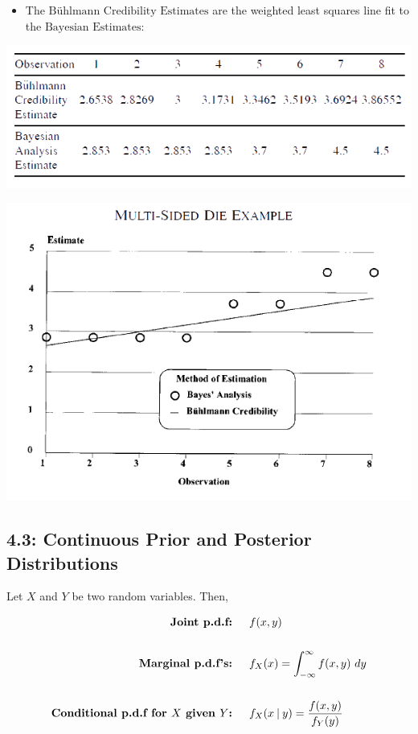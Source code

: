 \documentclass[
]{article}
\providecommand{\tightlist}{%
  \setlength{\itemsep}{0pt}\setlength{\parskip}{0pt}}
\begin{document}
\begin{itemize}
\tightlist
\item
  The \(\text{Bühlmann Credibility Estimates}\) are the weighted least
  squares line fit to the \(\text{Bayesian Estimates}\):
\end{itemize}

\includegraphics{Figures/6+.png}

\begin{purple}

\includegraphics{Figures/7+.png}

\end{purple}

\hypertarget{continuous-prior-and-posterior-distributions}{%
\subsection{4.3: Continuous Prior and Posterior
Distributions}\label{continuous-prior-and-posterior-distributions}}

\begin{blue}

Let \(X\) and \(Y\) be two random variables. Then,

\[
  \begin{align}
    \textbf{Joint p.d.f: }& \quad f(x,y) \\ \\
    \textbf{Marginal p.d.f's: }& \quad f_X (x) = \int_{-\infty}^\infty f(x,y) \ dy  \\ \\
    \textbf{Conditional p.d.f for } X \textbf{ given } Y \textbf{: }& \quad f_X(x \:\vert\: y) = \dfrac{f(x,y)}{f_Y(y)} \\ \\
  \end{align}
\]

\end{blue}
\end{document}
